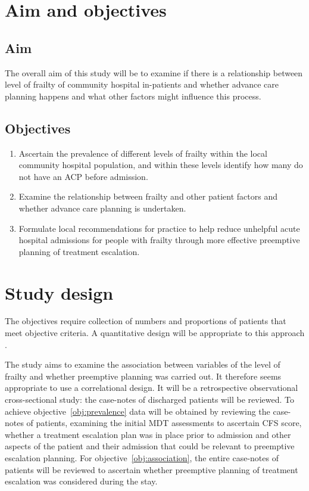 \documentclass
[
	12pt,
	a4paper,
	oneside,
]{article}
\begin{document}
\section{Aim and objectives}

\subsection{Aim}
The overall aim of this study will be to examine if there is a relationship between
level of frailty of community hospital in-patients and whether advance care planning
happens and what other factors might influence this process.

\subsection{Objectives}

\begin{enumerate}
\item	Ascertain the prevalence of different levels of frailty within the local community
		hospital population, and within these levels identify how many do not have
		an ACP before admission.\label{obj:prevalence}
\item	Examine the relationship between frailty and other patient factors and
		whether advance care planning is undertaken.\label{obj:association}
\item	Formulate local recommendations for practice to help reduce unhelpful
		acute hospital admissions for people with frailty through more effective
		preemptive planning of treatment escalation.
\end{enumerate}

\section{Study design} 
\label{sec:design}
The objectives require collection of numbers
and proportions of patients that meet objective criteria. A quantitative design
will be appropriate to this approach \parencite{parahoo:14}.

The study aims to examine the association between variables of 
the level of frailty and whether preemptive planning
was carried out. It therefore seems appropriate to use a correlational design. 
It will be a retrospective observational 
cross-sectional study: the case-notes of discharged patients will be reviewed. To achieve 
objective~\ref{obj:prevalence}
data will be obtained by reviewing the case-notes
of patients, examining the initial MDT assessments to ascertain CFS score, 
whether a treatment escalation plan was in place prior to admission and other aspects
of the patient and their admission that could be relevant to preemptive escalation
planning. For objective~\ref{obj:association}, the entire case-notes of patients 
will be reviewed to ascertain whether preemptive planning of treatment escalation 
was considered during the stay. 
\end{document}
